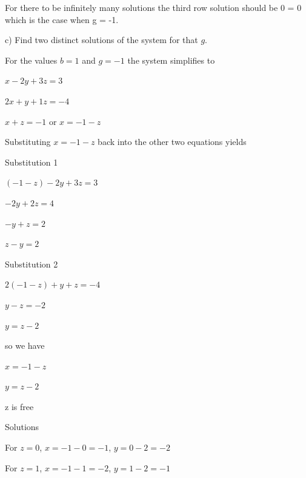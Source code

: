 \documentclass{article}
\begin{document}
For there to be infinitely many solutions the third row solution should be 0 = 0 which is the case when g = -1.

c) Find two distinct solutions of the system for that $g$.

For the values $b=1$ and $g = -1$ the system simplifies to

$x - 2y + 3z = 3$

$2x + y + 1z = -4$

$x+z = -1$ or $x = -1 -z$

Substituting $x=-1-z$ back into the other two equations yields

Substitution 1

$(-1 - z) - 2y + 3z = 3$

$- 2y + 2z = 4$

$-y+z=2$

$z-y = 2$

Substitution 2

$2(-1 -z) + y + z = -4$

$y - z = -2$

$y = z - 2$

so we have

$x=-1-z$ 

$y = z - 2$

z is free

Solutions

For $z = 0$, $x=-1-0=-1$, $y = 0 - 2 = -2$

For $z = 1$, $x = -1 -1 = -2$, $y = 1 -2 = -1$
\end{document}
